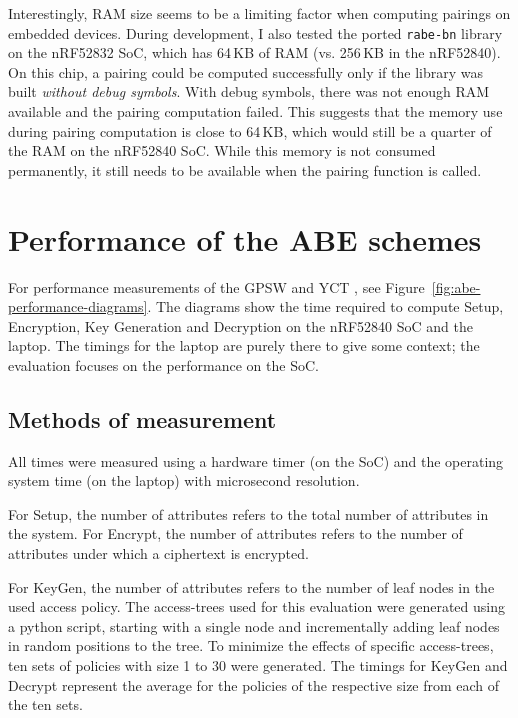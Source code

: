 Interestingly, RAM size seems to be a limiting factor when computing pairings on embedded devices.
During development, I also tested the ported \texttt{rabe-bn} library on the nRF52832 SoC, which has 64\,KB of RAM (vs. 256\,KB in the nRF52840). 
On this chip, a pairing could be computed successfully only if the library was built \emph{without debug symbols}.
With debug symbols, there was not enough RAM available and the pairing computation failed.
This suggests that the memory use during pairing computation is close to 64\,KB, which would still be a quarter of the RAM on the nRF52840 SoC.
While this memory is not consumed permanently, it still needs to be available when the pairing function is called.

\section{Performance of the ABE schemes}

For performance measurements of the GPSW and YCT , see Figure~\ref{fig:abe-performance-diagrams}. 
The diagrams show the time required to compute Setup, Encryption, Key Generation and Decryption on the nRF52840 SoC and the laptop.
The timings for the laptop are purely there to give some context; the evaluation focuses on the performance on the SoC.



\subsection{Methods of measurement}

All times were measured using a hardware timer (on the SoC) and the operating system time (on the laptop) with microsecond resolution.

For Setup, the number of attributes refers to the total number of attributes in the system.
For Encrypt, the number of attributes refers to the number of attributes under which a ciphertext is encrypted.

For KeyGen, the number of attributes refers to the number of leaf nodes in the used access policy.
The \glspl{access-tree} used for this evaluation were generated using a python script, starting with a single node and incrementally adding leaf nodes in random positions to the tree.
To minimize the effects of specific \glspl{access-tree}, ten sets of policies with size 1 to 30 were generated.
The timings for KeyGen and Decrypt represent the average for the policies of the respective size from each of the ten sets.

